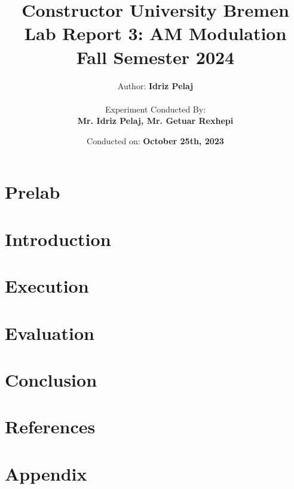 \documentclass[12pt]{report}
\title{
    \textbf{Constructor University Bremen} \\
    \vspace{1cm}
    \textbf{Lab Report 3: AM Modulation} \\ 
    Fall Semester 2024 \\
}
\author{
    Author: \textbf{Idriz Pelaj} \\
    \vspace{1cm} \\
    Experiment Conducted By: \\ \textbf{Mr. Idriz Pelaj, Mr. Getuar Rexhepi}
}
\date{Conducted on: \textbf{October 25th, 2023}}
\begin{document}
\maketitle

\chapter{Prelab}
\vspace{-1cm}


\chapter{Introduction}
\vspace{-1cm}


\chapter{Execution}
\vspace{-1cm}


\chapter{Evaluation}
\vspace{-1cm}


\chapter{Conclusion}
\vspace{-1cm}


\chapter{References}
\vspace{-1cm}


\chapter{Appendix}
\vspace{-1cm}

\end{document}
